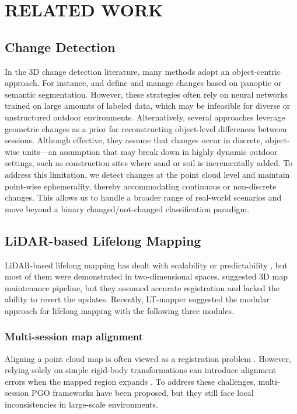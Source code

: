 \section{RELATED WORK}
\label{sec:realtedwork}

\subsection{Change Detection}
In the 3D change detection literature, many methods adopt an object-centric approach. For instance, \citeauthor{schmid2022panoptic} \cite{schmid2022panoptic} and \citeauthor{langer2020robust} \cite{langer2020robust} define and manage changes based on panoptic or semantic segmentation. However, these strategies often rely on neural networks trained on large amounts of labeled data, which may be infeasible for diverse or unstructured outdoor environments.
Alternatively, several approaches \cite{rowell2024lista, adam2022objects} leverage geometric changes as a prior for reconstructing object-level differences between sessions. Although effective, they assume that changes occur in discrete, object-wise units---an assumption that may break down in highly dynamic outdoor settings, such as construction sites where sand or soil is incrementally added. To address this limitation, we detect changes at the point cloud level and maintain point-wise ephemerality, thereby accommodating continuous or non-discrete changes. This allows us to handle a broader range of real-world scenarios and move beyond a binary changed/not-changed classification paradigm.

\subsection{LiDAR-based Lifelong Mapping}
LiDAR-based lifelong mapping has dealt with scalability \cite{lazaro2018efficient, zhao2021general, kurz2021geometry} or predictability \cite{krajnik2017fremen}, but most of them were demonstrated in two-dimensional spaces.
\citeauthor{pomerleau2014long} \cite{pomerleau2014long} suggested 3D map maintenance pipeline, but they assumed accurate registration and lacked the ability to revert the updates.
Recently, LT-mapper \cite{kim2022lt} suggested the modular approach for lifelong mapping with the following three modules.

\subsubsection{Multi-session map alignment} 
Aligning a point cloud map is often viewed as a registration problem \cite{yin2023automerge, 24frame, yang2024lifelong}. 
However, relying solely on simple rigid-body transformations can introduce alignment errors when the mapped region expands \cite{rowell2024lista}.
To address these challenges, multi-session \ac{PGO} frameworks \cite{kim2022lt, rowell2024lista} have been proposed, but they still face local inconsistencies in large-scale environments. 

